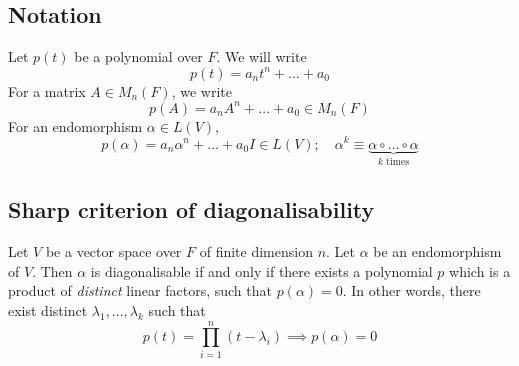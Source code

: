 \subsection{Notation}
Let \( p(t) \) be a polynomial over \( F \).
We will write
\[
	p(t) = a_n t^n + \dots + a_0
\]
For a matrix \( A \in M_n(F) \), we write
\[
	p(A) = a_n A^n + \dots + a_0 \in M_n(F)
\]
For an endomorphism \( \alpha \in L(V) \),
\[
	p(\alpha) = a_n \alpha^n + \dots + a_0 I \in L(V);\quad \alpha^k \equiv \underbrace{\alpha \circ \dots \circ \alpha}_{k \text{ times}}
\]

\subsection{Sharp criterion of diagonalisability}
\begin{theorem}
	Let \( V \) be a vector space over \( F \) of finite dimension \( n \).
	Let \( \alpha \) be an endomorphism of \( V \).
	Then \( \alpha \) is diagonalisable if and only if there exists a polynomial \( p \) which is a product of \textit{distinct} linear factors, such that \( p(\alpha) = 0 \).
	In other words, there exist distinct \( \lambda_1, \dots, \lambda_k \) such that
	\[
		p(t) = \prod_{i=1}^n (t - \lambda_i) \implies p(\alpha) = 0
	\]
\end{theorem}
